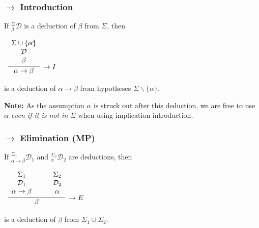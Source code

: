 \documentclass{beamer}
\begin{document}
\begin{frame}
  \frametitle{$\rightarrow$ Introduction}

	If $^{\Sigma}_{\beta}\mathcal{D}$ is a deduction of $\beta$ from $\Sigma$, then

	\begin{center}		
		$\begin{array}{c}		
			\infer[\rightarrow I]{\alpha \rightarrow \beta}
				{\begin{array}{c} \Sigma \cup \{\cancel{\alpha}\} \\ \mathcal{D} \\ \beta \end{array}}
		\end{array}$
	\end{center}

	is a deduction of $\alpha \rightarrow \beta$ from hypotheses $\Sigma \backslash \{\alpha\}$.
	
	\vspace{1.5cm} 
	
	{\bf Note: }As the assumption $\alpha$ is struck out after this deduction, we are free to use $\alpha$ \emph{even if it is not in} $\Sigma$ when using implication introduction. 

\end{frame}

\begin{frame}
	\frametitle{$\rightarrow$ Elimination (MP)}
	
	If $^{\Sigma_{1}}_{\alpha \rightarrow \beta}\mathcal{D}_{1}$ and $^{\Sigma_{2}}_{\alpha}\mathcal{D}_{2}$ are deductions, then
	
	\vspace{0.5cm}
	
	\begin{center}
		$\begin{array}{c}		
			\infer[\rightarrow E]{\beta}{\begin{array}{c} \Sigma_{1} \\ \mathcal{D}_{1} \\ \alpha \rightarrow \beta \end{array} \quad & \begin{array}{c} \Sigma_{2} \\ \mathcal{D}_{2} \\ \alpha \end{array}}	
		\end{array}$
	\end{center}
	
	is a deduction of $\beta$ from $\Sigma_{1} \cup \Sigma_{2}$.
\end{frame}
\end{document}
